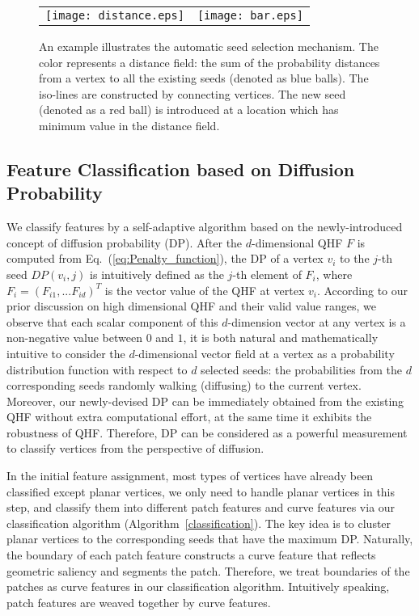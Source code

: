 \documentclass[10pt,journal,cspaper,compsoc]{IEEEtran}
\begin{document}
\begin{figure}[t]
\begin{center}
\begin{tabular}{@{}c@{} @{}c@{}}
\texttt{[image: distance.eps]}&
\texttt{[image: bar.eps]} \\
\end{tabular}
\caption{An example illustrates the automatic seed selection
mechanism. The color represents a distance field: the sum of
the probability distances from a vertex to all the
existing seeds (denoted as blue balls). The iso-lines are constructed
by connecting vertices. The new seed (denoted as a red ball) is
introduced at a location which has minimum value in the distance
field.}
\label{fig:distance}
\end{center}
\end{figure}

\subsection{Feature Classification based on Diffusion Probability}
\label{sec:FC}

We classify features by a self-adaptive algorithm based on the
newly-introduced concept of diffusion probability (DP). After the
$d$-dimensional QHF $F$ is computed from
Eq.~(\ref{eq:Penalty_function}), the DP of a vertex $v_i$ to the
$j$-th seed $DP(v_i,j)$ is intuitively defined as the $j$-th element
of $F_i$, where $F_i=(F_{i1},...F_{id})^T$ is the vector value of the
QHF at vertex $v_i$. According to our prior discussion on high
dimensional QHF and their valid value ranges, we observe that each
scalar component of this $d$-dimension vector at any vertex is a
non-negative value between $0$ and $1$, it is both natural and
mathematically intuitive to consider the $d$-dimensional vector field
at a vertex as a probability distribution function with respect to $d$
selected seeds: the probabilities from the $d$ corresponding seeds
randomly walking (diffusing) to the current vertex. Moreover, our
newly-devised DP can be immediately obtained from the existing QHF
without extra computational effort, at the same time it exhibits the
robustness of QHF. Therefore, DP can be considered as a powerful
measurement to classify vertices from the perspective of diffusion.

In the initial feature assignment, most types of vertices have already
been classified except planar vertices, we only need to handle planar vertices in this
step, and classify them into different patch features and curve
features via our classification algorithm
(Algorithm~\ref{classification}). The key idea is to cluster planar
vertices to the corresponding seeds that have the maximum DP.
Naturally, the boundary of each patch feature constructs a curve
feature that reflects geometric saliency and segments the patch.
Therefore, we treat boundaries of the patches as curve features in our
classification algorithm. Intuitively speaking, patch features are
weaved together by curve features.
\end{document}
